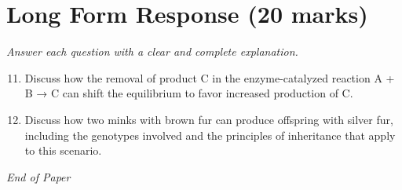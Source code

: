 \documentclass[12pt]{article}
\begin{document}
\section*{Long Form Response (20 marks)}
\textit{Answer each question with a clear and complete explanation.}
\begin{enumerate}[label=\arabic*.]
\setcounter{enumi}{10}
\item Discuss how the removal of product C in the enzyme-catalyzed reaction A + B → C can shift the equilibrium to favor increased production of C.
\item Discuss how two minks with brown fur can produce offspring with silver fur, including the genotypes involved and the principles of inheritance that apply to this scenario.
\end{enumerate}

\vfill
\noindent\textit{End of Paper}
\end{document}
